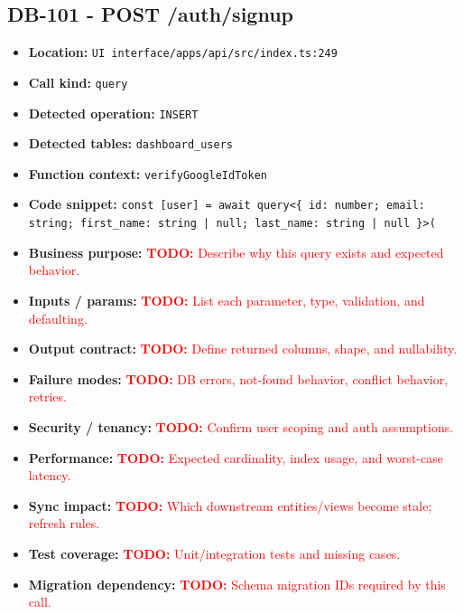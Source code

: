 \documentclass[11pt]{article}
\newcommand{\todoitem}[1]{\textcolor{red}{\textbf{TODO:} #1}}
\begin{document}
\subsection{DB-101 - POST /auth/signup}
\begin{itemize}[leftmargin=1.5em]
\item \textbf{Location:} \texttt{UI interface/apps/api/src/index.ts:249}
\item \textbf{Call kind:} \texttt{query}
\item \textbf{Detected operation:} \texttt{INSERT}
\item \textbf{Detected tables:} \texttt{dashboard\_users}
\item \textbf{Function context:} \texttt{verifyGoogleIdToken}
\item \textbf{Code snippet:} \texttt{const [user] = await query<\{ id: number; email: string; first\_name: string | null; last\_name: string | null \}>(}
\item \textbf{Business purpose:} \todoitem{Describe why this query exists and expected behavior.}
\item \textbf{Inputs / params:} \todoitem{List each parameter, type, validation, and defaulting.}
\item \textbf{Output contract:} \todoitem{Define returned columns, shape, and nullability.}
\item \textbf{Failure modes:} \todoitem{DB errors, not-found behavior, conflict behavior, retries.}
\item \textbf{Security / tenancy:} \todoitem{Confirm user scoping and auth assumptions.}
\item \textbf{Performance:} \todoitem{Expected cardinality, index usage, and worst-case latency.}
\item \textbf{Sync impact:} \todoitem{Which downstream entities/views become stale; refresh rules.}
\item \textbf{Test coverage:} \todoitem{Unit/integration tests and missing cases.}
\item \textbf{Migration dependency:} \todoitem{Schema migration IDs required by this call.}
\end{itemize}
\end{document}

